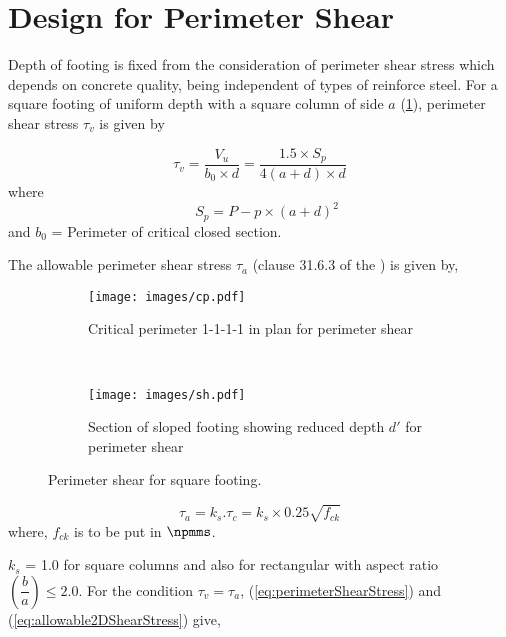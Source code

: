 \section{Design for Perimeter Shear} Depth of footing is fixed from 
the consideration of perimeter shear stress which depends on concrete
quality, being independent of types of reinforce steel. For a square 
footing of uniform depth with a square column of side $a$
(\fig \ref{critical perimeter 1-1-1-1}), perimeter shear stress
$\tau_{v}$ is given by

\begin{equation}
\label{eq:perimeterShearStress}
\tau_{v} = \frac{V_{u}} {{b_{0}} \times d} 
=\frac{1.5 \times S_{p}} {4(a + d) \times d} 
\end{equation}
where 
\begin{equation}
\label{eq:perimeterShearForce}
\quad S_{p} = P - p \times (a + d)^2
\end{equation}
and $b_0$ = Perimeter of critical closed section.

The allowable perimeter shear stress ${\tau_{a}}$ (clause 31.6.3 of
the ) is given by,


\begin{figure}
  \centering
  \begin{subfigure}[b]{0.5\textwidth}
    \texttt{[image: images/cp.pdf]}
    \caption{Critical perimeter 1-1-1-1 in plan for perimeter shear}
    \label{critical perimeter 1-1-1-1}
  \end{subfigure}\\
  \begin{subfigure}[b]{0.5\textwidth}
    \texttt{[image: images/sh.pdf]}
    \caption{Section of sloped footing showing reduced depth ${d'}$
     for perimeter shear}
    \label{sectionslopefooting}
  \end{subfigure}
\caption{Perimeter shear for square footing.}
\label{Perimeter-shear-for-square-footing}
\end{figure}


\begin{equation}
\label{eq:allowable2DShearStress}
\tau_{a} = k_{s} . \tau_{c} = k_{s} \times 0.25 \sqrt{f_{ck}}
\end{equation}
where, $f_{ck}$ is to be put in $\npmms$.

$k_{s}$ = 1.0 for square columns and also for rectangular with aspect 
ratio $\left( \dfrac{b}{a} \right) \leq {2.0}$. For the condition 
$\tau_{v} = \tau_{a}$, \eqn (\ref{eq:perimeterShearStress}) and
(\ref{eq:allowable2DShearStress}) give,

